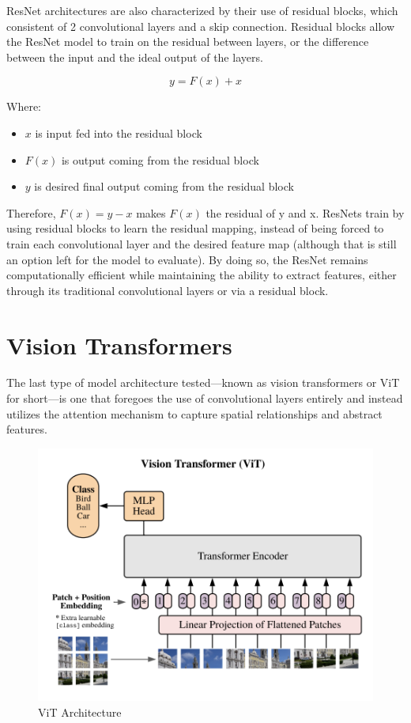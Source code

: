 \documentclass [MAS] {uclathes}
\begin{document}
ResNet architectures are also characterized by their use of residual blocks, which consistent of 2 convolutional layers 
and a skip connection. Residual blocks allow the ResNet model to train on the residual between layers, or the difference 
between the input and the ideal output of the layers. 

\[y = F(x) + x\]

Where:
\begin{itemize}
    \item \(x\) is input fed into the residual block
    \item \(F(x)\) is output coming from the residual block
    \item \(y\) is desired final output coming from the residual block
\end{itemize}

Therefore, \(F(x) = y - x\) makes \(F(x)\) the residual of y and x. ResNets train by using residual blocks to learn the 
residual mapping, instead of being forced to train each convolutional layer and the desired feature map (although that 
is still an option left for the model to evaluate). By doing so, the ResNet remains computationally efficient while 
maintaining the ability to extract features, either through its traditional convolutional layers or via a residual 
block. 

\section{Vision Transformers}

The last type of model architecture tested---known as vision transformers or ViT for short---is one that foregoes the 
use of convolutional layers entirely and instead utilizes the attention mechanism to capture spatial relationships and 
abstract features. 

\begin{figure} [H]
    \centering
    \includegraphics[width=0.6\linewidth]{figures/ViT Architecture.png}
    \caption{ViT Architecture}
    \label{fig:ViT Architecture}
\end{figure}
\end{document}
